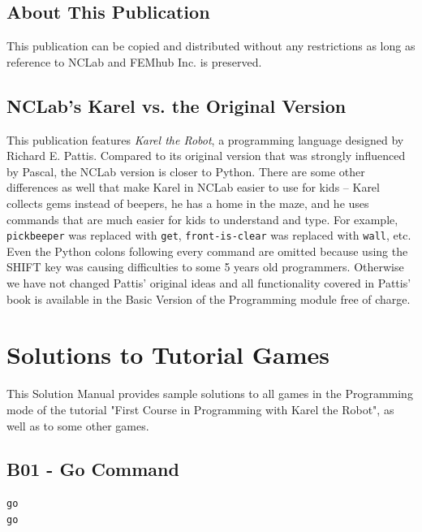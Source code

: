 \documentclass[article,A4,12pt]{llncs}
\begin{document}
\subsection*{About This Publication}
This publication can be copied and distributed without any restrictions
as long as reference to NCLab and FEMhub Inc. is preserved.

\subsection*{NCLab's Karel vs. the Original Version}
This publication features {\em Karel the Robot}, a programming language 
designed by Richard E. Pattis. Compared to its original version that was
strongly influenced by Pascal, the NCLab version is closer to Python.
There are some other differences as well that make Karel in NCLab easier to use 
for kids -- Karel collects gems instead of beepers, he has a home in the 
maze, and he uses commands that are much easier for kids to understand
and type. For example, {\tt pickbeeper} was replaced with {\tt get}, 
{\tt front-is-clear} was replaced with {\tt wall}, etc. Even the Python 
colons following every command are omitted because using the SHIFT key 
was causing difficulties to some 5 years old programmers. 
Otherwise we have not changed Pattis' original ideas and all functionality 
covered in Pattis' book is available in the Basic Version of the Programming
module free of charge. 

\normalsize

\newpage
\setcounter{tocdepth}{2}
\tableofcontents

\newpage

\pagestyle{plain}
\setcounter{page}{1}


\section{Solutions to Tutorial Games}

This Solution Manual provides sample solutions to all games in the 
Programming mode of the tutorial "First Course in Programming with
Karel the Robot", as well as to some other games.

\subsection{B01 - Go Command}
\begin{verbatim}
go
go
\end{verbatim}
\end{document}
